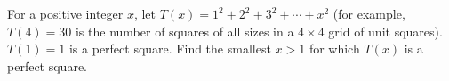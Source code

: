 For a positive integer $x$, let $T(x)=1^2+2^2+3^2+\cdots+x^2$ (for example, $T(4)=30$ is the number of squares of all sizes in a $4\times4$ grid of unit squares). $T(1)=1$ is a perfect square. Find the smallest $x>1$ for which $T(x)$ is a perfect square.
